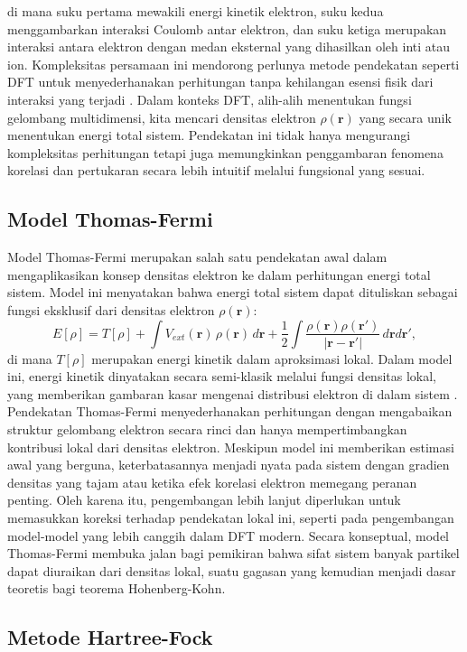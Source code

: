 di mana suku pertama mewakili energi kinetik elektron, suku kedua menggambarkan interaksi Coulomb antar elektron, dan suku ketiga merupakan interaksi antara elektron dengan medan eksternal yang dihasilkan oleh inti atau ion. Kompleksitas persamaan ini mendorong perlunya metode pendekatan seperti DFT untuk menyederhanakan perhitungan tanpa kehilangan esensi fisik dari interaksi yang terjadi \citep{Kohn1965}. Dalam konteks DFT, alih-alih menentukan fungsi gelombang multidimensi, kita mencari densitas elektron \(\rho(\mathbf{r})\) yang secara unik menentukan energi total sistem. Pendekatan ini tidak hanya mengurangi kompleksitas perhitungan tetapi juga memungkinkan penggambaran fenomena korelasi dan pertukaran secara lebih intuitif melalui fungsional yang sesuai. \subsection{Model Thomas-Fermi}
Model Thomas-Fermi merupakan salah satu pendekatan awal dalam mengaplikasikan konsep densitas elektron ke dalam perhitungan energi total sistem. Model ini menyatakan bahwa energi total sistem dapat dituliskan sebagai fungsi eksklusif dari densitas elektron \(\rho(\mathbf{r})\):
\begin{equation}
    E[\rho] = T[\rho] + \int V_{ext}(\mathbf{r})\,\rho(\mathbf{r})\,d\mathbf{r} + \frac{1}{2}\int \frac{\rho(\mathbf{r})\rho(\mathbf{r'})}{|\mathbf{r}-\mathbf{r'}|}\, d\mathbf{r}d\mathbf{r'},
\end{equation}
di mana \(T[\rho]\) merupakan energi kinetik dalam aproksimasi lokal. Dalam model ini, energi kinetik dinyatakan secara semi-klasik melalui fungsi densitas lokal, yang memberikan gambaran kasar mengenai distribusi elektron di dalam sistem \citep{Martin2004}. Pendekatan Thomas-Fermi menyederhanakan perhitungan dengan mengabaikan struktur gelombang elektron secara rinci dan hanya mempertimbangkan kontribusi lokal dari densitas elektron. Meskipun model ini memberikan estimasi awal yang berguna, keterbatasannya menjadi nyata pada sistem dengan gradien densitas yang tajam atau ketika efek korelasi elektron memegang peranan penting. Oleh karena itu, pengembangan lebih lanjut diperlukan untuk memasukkan koreksi terhadap pendekatan lokal ini, seperti pada pengembangan model-model yang lebih canggih dalam DFT modern. Secara konseptual, model Thomas-Fermi membuka jalan bagi pemikiran bahwa sifat sistem banyak partikel dapat diuraikan dari densitas lokal, suatu gagasan yang kemudian menjadi dasar teoretis bagi teorema Hohenberg-Kohn. \subsection{Metode Hartree-Fock}

